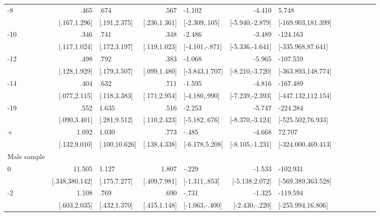 \begin{table}[h]
\begin{adjustbox}{max width=\linewidth}
\begin{threeparttable}
{\begin{tabular}{l*{6}{D{.}{.}{-1}l}}
-8             &            .465&            .674&            .567&          -1.102&          -4.410&           5.748\\
                &    [.167,1.296]&    [.191,2.375]&    [.236,1.361]&   [-2.309,.105]& [-5.940,-2.879]&[-169.903,181.399]\\
-10            &            .346&            .741&            .348&          -2.486&          -3.489&        -124.163\\
                &    [.117,1.024]&    [.172,3.197]&    [.119,1.023]&  [-4.101,-.871]& [-5.336,-1.641]&[-335.968,87.641]\\
-12           &            .498&            .792&            .383&          -1.068&          -5.965&        -107.559\\
                &    [.128,1.929]&    [.179,3.507]&    [.099,1.480]&  [-3.843,1.707]& [-8.210,-3.720]&[-363.893,148.774]\\
-14           &            .404&            .632&            .711&          -1.595&          -4.816&        -167.489\\
                &    [.077,2.115]&    [.118,3.383]&    [.171,2.954]&   [-4.180,.990]& [-7.239,-2.393]&[-447.132,112.154]\\
-19           &            .552&           1.635&            .516&          -2.253&          -5.747&        -224.284\\
                &    [.090,3.401]&    [.281,9.512]&    [.110,2.423]&   [-5.182,.676]& [-8.370,-3.124]&[-525.502,76.933]\\
+             &           1.092&           1.030&            .773&           -.485&          -4.668&          72.707\\
                &    [.132,9.010]&   [.100,10.626]&    [.138,4.338]&  [-6.178,5.208]& [-8.105,-1.231]&[-324.000,469.413]\\
\midrule
Male sample &&&&&&\\
0               &          11.505&           1.127&           1.807&           -.229&          -1.533&        -102.931\\
                &  [.348,380.142]&    [.175,7.277]&    [.409,7.981]&   [-1.311,.853]&  [-5.138,2.072]&[-569.389,363.528]\\
-2             &           1.108&            .769&            .690&           -.731&          -1.325&        -119.594\\
                &    [.603,2.035]&    [.432,1.370]&    [.415,1.148]&  [-1.063,-.400]&  [-2.430,-.220]&[-255.994,16.806]\\

\end{tabular}}
\end{threeparttable}
\end{adjustbox}
\end{table}

